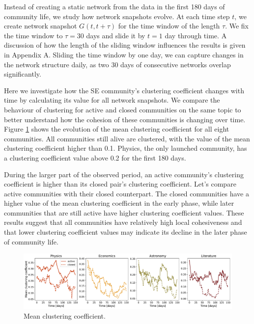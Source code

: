 Instead of creating a static network from the data in the first 180 days of community life, we study how network snapshots evolve. At each time step $t$, we create network snapshot $G(t, t+\tau)$ for the time window of the length $\tau$. We fix the time window to $\tau=30$ days and slide it by $t=1$ day through time. A discussion of how the length of the sliding window influences the results is given in Appendix A. Sliding the time window by one day, we can capture changes in the network structure daily, as two 30 days of consecutive networks overlap significantly. 

Here we investigate how the SE community’s clustering coefficient changes with time by calculating its value for all network snapshots. We compare the behaviour of clustering for active and closed communities on the same topic to better understand how the cohesion of these communities is changing over time. Figure \ref{fig:clustering} shows the evolution of the mean clustering coefficient for all eight communities. All communities still alive are clustered, with the value of the mean clustering coefficient higher than 0.1. Physics, the only launched community, has a clustering coefficient value above 0.2 for the first 180 days.

During the larger part of the observed period, an active community’s clustering coefficient is higher than its closed pair’s clustering coefficient. Let’s compare active communities with their closed counterpart. The closed communities have a higher value of the mean clustering coefficient in the early phase, while later communities that are still active have higher clustering coefficient values. These results suggest that all communities have relatively high local cohesiveness and that lower clustering coefficient values may indicate its decline in the later phase of community life. 

\begin{figure}
	\centering
	\includegraphics[width=\linewidth]{figures/stackexchange/clustering.pdf}%
	\caption{Mean clustering coefficient.}
	\label{fig:clustering}
\end{figure}

